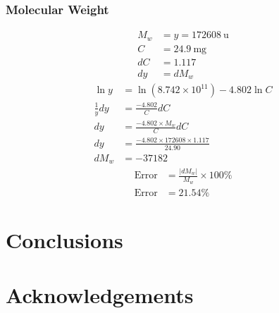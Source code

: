 \documentclass{article}
\begin{document}
\begin{multicols}{2}
                \subsubsection{Molecular Weight}
                    \begin{align}
                        M_w &= y = \qty{172608}{\atomicmassunit} \nonumber\\
                        C &= \qty{24.9}{\milli\gram} \nonumber\\
                        dC &= 1.117 \nonumber\\
                        dy &= dM_w \nonumber
                    \end{align}
                    \begin{align}
                        \ln y &= \ln{(8.742 \times 10^{11})} - 4.802 \ln{C}\\
                        \frac{1}{y}dy &= \frac{-4.802}{C}dC \nonumber\\
                        dy &= \frac{-4.802 \times M_w}{C}dC \nonumber\\
                        dy &= \frac{-4.802 \times 172608 \times 1.117}{24.90} \nonumber\\
                        dM_w &= - 37182 \nonumber
                    \end{align}
                    \begin{align}
                        \text{Error} &= \frac{|dM_w|}{M_w} \times 100\%\\
                        \text{Error} &= 21.54\% \nonumber
                    \end{align}
        \section{Conclusions}
        \section{Acknowledgements}
        \printbibliography
    \end{multicols}
\end{document}
